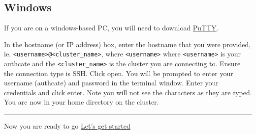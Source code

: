 \documentclass[
]{book}
\begin{document}
\hypertarget{windows}{%
\subsection{Windows}\label{windows}}

If you are on a windows-based PC, you will need to download \href{https://www.putty.org/}{PuTTY}.

In the hostname (or IP address) box, enter the hostname that you were provided, ie. \texttt{\textless{}username\textgreater{}@\textless{}cluster\_name\textgreater{}}, where \texttt{\textless{}username\textgreater{}} where \texttt{\textless{}username\textgreater{}} is your authcate and the \texttt{\textless{}cluster\_name\textgreater{}} is the cluster you are connecting to. Ensure the connection type is SSH. Click open. You will be prompted to enter your username (authcate) and password in the terminal window. Enter your credentials and click enter. Note you will not see the characters as they are typed. You are now in your home directory on the cluster.

\begin{center}\rule{0.5\linewidth}{0.5pt}\end{center}

Now you are ready to go
{\href{introduction.html}{Let's get started}}
\end{document}
